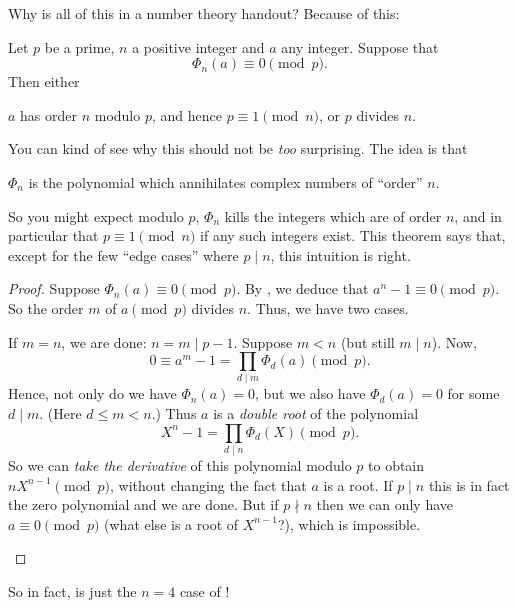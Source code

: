 \documentclass[11pt]{scrartcl}
\begin{document}
Why is all of this in a number theory handout?
Because of this:
\begin{theorem}
  \label{thm:cyclotomic_main}
  Let $p$ be a prime, $n$ a positive integer and $a$ any integer.
  Suppose that \[ \Phi_n(a) \equiv 0 \pmod p. \]
  Then either
  \begin{itemize}
    \ii $a$ has order $n$ modulo $p$, and hence $p \equiv 1 \pmod n$, or
    \ii $p$ divides $n$.
  \end{itemize}
\end{theorem}
\begin{remark}
  You can kind of see why this should not be \emph{too} surprising.
  The idea is that
  \begin{center}
    $\Phi_n$ is the polynomial which annihilates complex numbers of ``order'' $n$.
  \end{center}
  So you might expect modulo $p$, $\Phi_n$ kills the integers which are of order $n$, and in particular
  that $p \equiv 1 \pmod n$ if any such integers exist.
  This theorem says that, except for the few ``edge cases'' where $p \mid n$,
  this intuition is right.
\end{remark}
\begin{proof}
  Suppose $\Phi_n(a) \equiv 0 \pmod p$.
  By , we deduce that $a^n-1 \equiv 0 \pmod p$.
  So the order $m$ of $a \pmod p$ divides $n$.
  Thus, we have two cases.
  \begin{itemize}
    \ii If $m = n$, we are done: $n = m \mid p-1$.
    \ii Suppose $m < n$ (but still $m \mid n$).
    Now,
    \[ 0 \equiv a^m-1 = \prod_{d \mid m} \Phi_d(a) \pmod p. \]
    Hence, not only do we have $\Phi_n(a) = 0$, but we also have $\Phi_d(a) = 0$ for some $d \mid m$.
    (Here $d \le m < n$.)
    Thus $a$ is a \emph{double root} of the polynomial
    \[ X^n - 1 = \prod_{d \mid n} \Phi_d(X) \pmod p. \]
    So we can \emph{take the derivative} of this polynomial modulo $p$ to obtain $nX^{n-1} \pmod p$,
    without changing the fact that $a$ is a root.
    If $p \mid n$ this is in fact the zero polynomial and we are done.
    But if $p \nmid n$ then we can only have $a \equiv 0 \pmod p$ (what else is a root of $X^{n-1}$?),
    which is impossible. \qedhere
  \end{itemize}
\end{proof}
So in fact, 
is just the $n=4$ case of !
\end{document}
